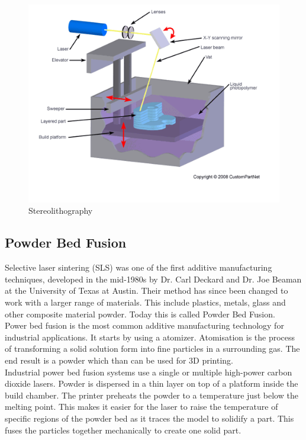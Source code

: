 \documentclass[11pt]{article}
\begin{document}
\begin{figure}[hbtp]
\caption{Stereolithography}
\centering
\includegraphics[scale=0.5]{build/Stereolithography.png}
\end{figure}


\subsection{Powder Bed Fusion}
Selective laser sintering (SLS) was one of the first additive manufacturing techniques, developed in the mid-1980s by Dr. Carl Deckard and Dr. Joe Beaman at the University of Texas at Austin. Their method has since been changed to work with a larger range of materials. This include plastics, metals, glass and other composite material powder. Today this is called Powder Bed Fusion. \\

Power bed fusion is the most common additive manufacturing technology for industrial applications. It starts by using a atomizer. Atomisation is the process of transforming a solid solution form into fine particles in a surrounding gas.  The end result is a powder which than can be used for 3D printing. \\

Industrial power bed fusion systems use a single or multiple high-power carbon dioxide lasers. Powder is dispersed in a thin layer on top of a platform inside  the build chamber.
The printer preheats the powder to a temperature just below the melting point. This makes it easier for the laser to raise the temperature of specific regions of the powder bed as it traces the model to solidify a part. This fuses the particles together mechanically to create one solid part.\\
\end{document}
